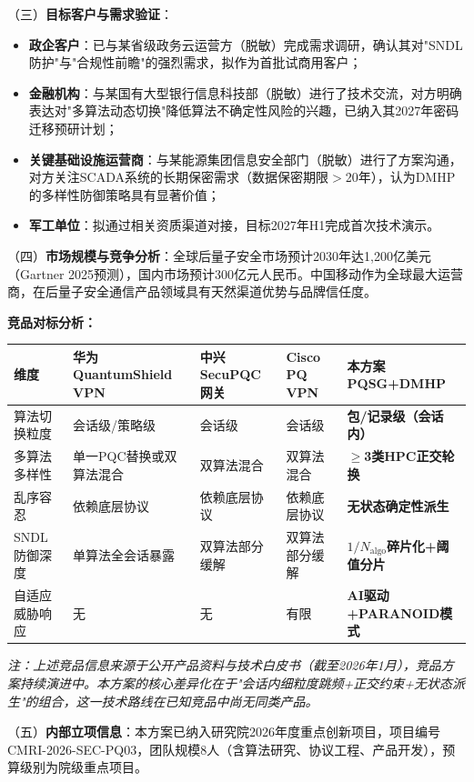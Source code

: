 ﻿\documentclass[12pt,a4paper]{article}
\begin{document}
{{（三）\textbf{目标客户与需求验证}：
\begin{itemize}[noitemsep]
    \item \textbf{政企客户}：已与某省级政务云运营方（脱敏）完成需求调研，确认其对"SNDL防护"与"合规性前瞻"的强烈需求，拟作为首批试商用客户；
    \item \textbf{金融机构}：与某国有大型银行信息科技部（脱敏）进行了技术交流，对方明确表达对"多算法动态切换"降低算法不确定性风险的兴趣，已纳入其2027年密码迁移预研计划；
    \item \textbf{关键基础设施运营商}：与某能源集团信息安全部门（脱敏）进行了方案沟通，对方关注SCADA系统的长期保密需求（数据保密期限$>$20年），认为DMHP的多样性防御策略具有显著价值；
    \item \textbf{军工单位}：拟通过相关资质渠道对接，目标2027年H1完成首次技术演示。
\end{itemize}

（四）\textbf{市场规模与竞争分析}：全球后量子安全市场预计2030年达1,200亿美元（Gartner 2025预测），国内市场预计300亿元人民币。中国移动作为全球最大运营商，在后量子安全通信产品领域具有天然渠道优势与品牌信任度。

\textbf{竞品对标分析：}


\begin{tabular}{|p{2.2cm}|p{2.8cm}|p{2.8cm}|p{2.8cm}|p{3.0cm}|}
\hline
\textbf{维度} & \textbf{华为 QuantumShield VPN} & \textbf{中兴 SecuPQC网关} & \textbf{Cisco PQ VPN} & \textbf{本方案 PQSG+DMHP} \\
\hline
算法切换粒度 & 会话级/策略级 & 会话级 & 会话级 & \textbf{包/记录级（会话内）} \\
\hline
多算法多样性 & 单一PQC替换或双算法混合 & 双算法混合 & 双算法混合 & \textbf{$\geq$3类HPC正交轮换} \\
\hline
乱序容忍 & 依赖底层协议 & 依赖底层协议 & 依赖底层协议 & \textbf{无状态确定性派生} \\
\hline
SNDL防御深度 & 单算法全会话暴露 & 双算法部分缓解 & 双算法部分缓解 & \textbf{$1/N_{\text{algo}}$碎片化+阈值分片} \\
\hline
自适应威胁响应 & 无 & 无 & 有限 & \textbf{AI驱动+PARANOID模式} \\
\hline
\end{tabular}
\vspace{0.3em}

\noindent\textit{注：上述竞品信息来源于公开产品资料与技术白皮书（截至2026年1月），竞品方案持续演进中。本方案的核心差异化在于"会话内细粒度跳频+正交约束+无状态派生"的组合，这一技术路线在已知竞品中尚无同类产品。}

（五）\textbf{内部立项信息}：本方案已纳入研究院2026年度重点创新项目，项目编号CMRI-2026-SEC-PQ03，团队规模8人（含算法研究、协议工程、产品开发），预算级别为院级重点项目。
}}
\end{document}
